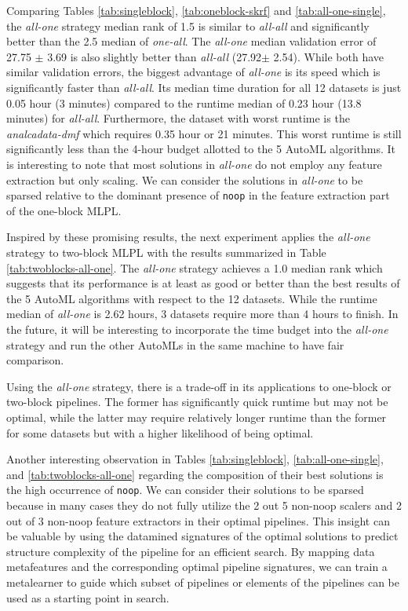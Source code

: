 \documentclass{juliacon}
\begin{document}
\vskip 6pt

Comparing Tables \ref{tab:singleblock}, \ref{tab:oneblock-skrf} and \ref{tab:all-one-single}, 
the \emph{all-one} strategy median rank of 1.5 is
similar to \emph{all-all} and significantly better than
the 2.5 median of \emph{one-all}. The \emph{all-one}
median validation error of 27.75
$\pm$ 3.69 is also slightly better than \emph{all-all} (27.92$\pm$ 2.54).
While both have similar validation errors, the biggest advantage of
\emph{all-one} is its speed which is significantly faster than \emph{all-all}.
Its median time duration for all 12 datasets is just 0.05
hour (3 minutes) compared to the runtime median of 0.23 hour (13.8 minutes)
for \emph{all-all}. Furthermore, the dataset with worst runtime is the
\emph{analcadata-dmf} which requires 0.35 hour or 21 minutes.  This worst
runtime is still significantly less than the 4-hour budget allotted to the 5
AutoML algorithms. It is interesting to note that most solutions in
\emph{all-one} do not employ any feature extraction but only scaling. We
can consider the solutions in \emph{all-one} to be sparsed relative to
the dominant presence of \texttt{noop} in the feature extraction part
of the one-block MLPL.

\vskip 6pt

Inspired by these promising results, the next experiment applies the
\emph{all-one} strategy to two-block MLPL with the results summarized in Table
\ref{tab:twoblocks-all-one}. The \emph{all-one} strategy achieves a 1.0 median
rank which suggests that its performance is at least as good or better than the
best results of the 5 AutoML algorithms with respect to the 12 datasets.
While the runtime median of \emph{all-one} is
2.62 hours, 3 datasets require more than 4 hours to finish.  
In the future, it will be interesting to incorporate the time budget into the 
\emph{all-one} strategy and run the other AutoMLs in the same machine to have fair comparison.

\vskip 6pt

Using the \emph{all-one} strategy, there is a trade-off in its applications
to one-block or two-block pipelines. The former has significantly quick runtime
but may not be optimal, while the latter may require relatively longer runtime
than the former for some datasets but with a higher likelihood of being optimal.

\vskip 6pt

Another interesting observation in Tables \ref{tab:singleblock},
\ref{tab:all-one-single}, and \ref{tab:twoblocks-all-one}
regarding the composition of their best solutions
is the high occurrence of \texttt{noop}.
We can consider their solutions to be sparsed because in many cases
they do not fully utilize
the 2 out 5 non-noop scalers and 2 out of 3 non-noop feature extractors in their optimal
pipelines.  This insight can be valuable by using the
datamined signatures of the optimal
solutions to predict structure complexity of the pipeline for an efficient search.
By mapping data metafeatures and the corresponding optimal pipeline signatures,
we can train a metalearner to guide which subset of pipelines or elements
of the pipelines can be used as a starting point in search.
\end{document}
